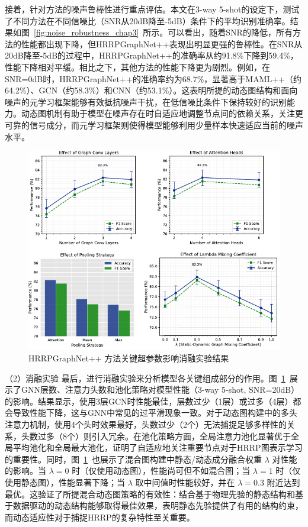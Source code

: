 接着，针对方法的噪声鲁棒性进行重点评估。本文在3-way 5-shot的设定下，测试了不同方法在不同信噪比（SNR从20dB降至-5dB）条件下的平均识别准确率。结果如图~\ref{fig:noise_robustness_chap3}~所示。可以看出，随着SNR的降低，所有方法的性能都出现下降，但HRRPGraphNet++表现出明显更强的鲁棒性。在SNR从20dB降至-5dB的过程中，HRRPGraphNet++的准确率从约91.8\%下降到59.4\%，性能下降相对平缓。相比之下，其他方法的性能下降更为剧烈。例如，在SNR=0dB时，HRRPGraphNet++的准确率约为68.7\%，显著高于MAML++（约64.2\%）、GCN（约58.3\%）和CNN（约53.1\%）。这表明所提的动态图结构和面向噪声的元学习框架能够有效抵抗噪声干扰，在低信噪比条件下保持较好的识别能力。动态图机制有助于模型在噪声存在时自适应地调整节点间的依赖关系，关注更可靠的信号成分，而元学习框架则使得模型能够利用少量样本快速适应当前的噪声水平。

\begin{figure}[h]
    \centering
    \includegraphics[width=\linewidth]{figures/abla.pdf} %
    \caption{HRRPGraphNet++ 方法关键超参数影响消融实验结果 }
    \label{fig:abla}
\end{figure}

（2）消融实验
最后，进行消融实验来分析模型各关键组成部分的作用。图~\ref{fig:abla}~展示了GNN层数、注意力头数和池化策略对模型性能（3-way 5-shot, SNR=20dB）的影响。结果显示，使用3层GCN时性能最佳，层数过少（1层）或过多（4层）都会导致性能下降，这与GNN中常见的过平滑现象一致。对于动态图构建中的多头注意力机制，使用4个头时效果最好，头数过少（2个）无法捕捉足够多样性的关系，头数过多（8个）则引入冗余。在池化策略方面，全局注意力池化显著优于全局平均池化和全局最大池化，证明了自适应地关注重要节点对于HRRP图表示学习的重要性。同时，图~\ref{fig:abla}~也展示了混合图构建中静态/动态成分融合权重 $\lambda$ 对性能的影响。当 $\lambda=0$ 时（仅使用动态图），性能尚可但不如混合图；当 $\lambda=1$ 时（仅使用静态图），性能显著下降；当 $\lambda$ 取中间值时性能较好，并在 $\lambda=0.3$ 附近达到最优。这验证了所提混合动态图策略的有效性：结合基于物理先验的静态结构和基于数据驱动的动态结构能够取得最佳效果，表明静态先验提供了有用的结构约束，而动态适应性对于捕捉HRRP的复杂特性至关重要。

